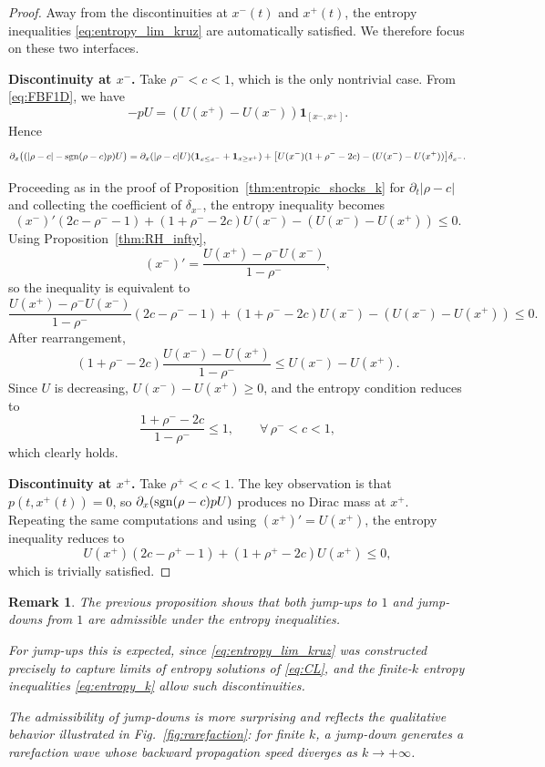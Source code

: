 \documentclass[11pt,twoside]{article}
\numberwithin{equation}{section}
\newcommand {\sgn} { {\rm sgn} }
\newtheorem{remark}[theorem]{Remark}
\begin{document}
\begin{proof}
Away from the discontinuities at $x^-(t)$ and $x^+(t)$, the entropy inequalities \eqref{eq:entropy_lim_kruz} are automatically satisfied. We therefore focus on these two interfaces.

\medskip
\noindent
\textbf{Discontinuity at $x^-$.}
Take $\rho^-<c<1$, which is the only nontrivial case.  
From \eqref{eq:FBF1D}, we have
\[
-pU=(U(x^+)-U(x^-))\mathbf{1}_{[x^-,x^+]}.
\]
Hence
\[
\partial_x\big((|\rho-c|-\sgn(\rho-c)p)U\big)
=
\partial_x(|\rho-c|U)(\mathbf{1}_{x\le x^-}+\mathbf{1}_{x\ge x^+})
+\big[U(x^-)(1+\rho^- -2c)-(U(x^-)-U(x^+))\big]\delta_{x^-}.
\]

Proceeding as in the proof of Proposition~\ref{thm:entropic_shocks_k} for $\partial_t|\rho-c|$ and collecting the coefficient of $\delta_{x^-}$, the entropy inequality becomes
\[
(x^-)'(2c-\rho^- -1)
+(1+\rho^- -2c)U(x^-)
-(U(x^-)-U(x^+))
\le 0.
\]
Using Proposition~\ref{thm:RH_infty},
\[
(x^-)'=\frac{U(x^+)-\rho^-U(x^-)}{1-\rho^-},
\]
so the inequality is equivalent to
\[
\frac{U(x^+)-\rho^-U(x^-)}{1-\rho^-}(2c-\rho^- -1)
+(1+\rho^- -2c)U(x^-)
-(U(x^-)-U(x^+))
\le 0.
\]
After rearrangement,
\[
(1+\rho^- -2c)\frac{U(x^-)-U(x^+)}{1-\rho^-}
\le
U(x^-)-U(x^+).
\]
Since $U$ is decreasing, $U(x^-)-U(x^+)\ge0$, and the entropy condition reduces to
\[
\frac{1+\rho^- -2c}{1-\rho^-}\le1,
\qquad \forall\,\rho^-<c<1,
\]
which clearly holds.

\medskip
\noindent
\textbf{Discontinuity at $x^+$.}
Take $\rho^+<c<1$.  
The key observation is that $p(t,x^+(t))=0$, so $\partial_x(\sgn(\rho-c)pU)$ produces no Dirac mass at $x^+$.  
Repeating the same computations and using $(x^+)'=U(x^+)$, the entropy inequality reduces to
\[
U(x^+)(2c-\rho^+ -1)
+(1+\rho^+ -2c)U(x^+)
\le 0,
\]
which is trivially satisfied.
\end{proof}

\begin{remark}
The previous proposition shows that both \emph{jump-ups} to $1$ and \emph{jump-downs} from $1$ are admissible under the entropy inequalities.  

For jump-ups this is expected, since \eqref{eq:entropy_lim_kruz} was constructed precisely to capture limits of entropy solutions of \eqref{eq:CL}, and the finite-$k$ entropy inequalities \eqref{eq:entropy_k} allow such discontinuities.  

The admissibility of jump-downs is more surprising and reflects the qualitative behavior illustrated in Fig.~\ref{fig:rarefaction}: for finite $k$, a jump-down generates a rarefaction wave whose backward propagation speed diverges as $k\to+\infty$.
\end{remark}
\end{document}
